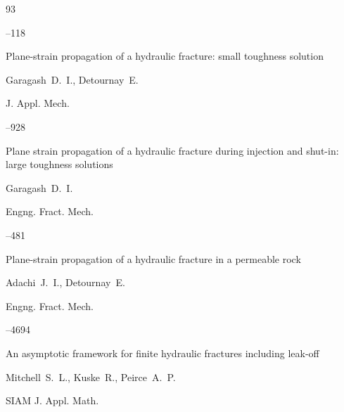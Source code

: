 \begin{thebibliography}{93}


--118





\paper Plane-strain propagation of a hydraulic fracture: small toughness solution

\by   Garagash~D.~I., Detournay~E.

\jour J. Appl. Mech.




–928







\paper Plane strain propagation of a hydraulic fracture during injection and shut-in: large toughness solutions

\by   Garagash~D.~I.

\jour Engng. Fract. Mech. 




–481





\paper Plane-strain propagation of a hydraulic fracture in a permeable rock

\by   Adachi~J.~I., Detournay~E.

\jour Engng. Fract. Mech. 




–4694





\paper An asymptotic framework for finite hydraulic fractures including leak-off

\by   Mitchell~S.~L.,  Kuske~R., Peirce~A.~P.

\jour SIAM J. Appl. Math.


\end{thebibliography}
